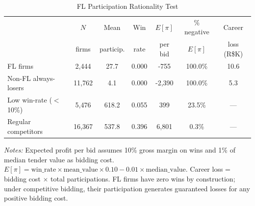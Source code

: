 \begin{table}[htbp]
\centering
\caption{FL Participation Rationality Test}
\label{tab:rationality}
\begin{threeparttable}
\small
\begin{tabular}{lcccccc}
\toprule
 & $N$ & Mean & Win & $E[\pi]$ & $\%$ negative & Career \\
 & firms & particip. & rate & per bid & $E[\pi]$ & loss (R\$K) \\
\midrule
FL firms & 2,444 & 27.7 & 0.000 & -755 & 100.0\% & 10.6 \\
Non-FL always-losers & 11,762 & 4.1 & 0.000 & -2,390 & 100.0\% & 5.3 \\
Low win-rate ($<$10\%) & 5,476 & 618.2 & 0.055 & 399 & 23.5\% & --- \\
Regular competitors & 16,367 & 537.8 & 0.396 & 6,801 & 0.3\% & --- \\
\bottomrule
\end{tabular}
\begin{tablenotes}
\small
\item \textit{Notes:} Expected profit per bid assumes 10\% gross margin on wins
and 1\% of median tender value as bidding cost.
$E[\pi] = \text{win\_rate} \times \text{mean\_value} \times 0.10 - 0.01 \times \text{median\_value}$.
Career loss = bidding cost $\times$ total participations.
FL firms have zero wins by construction; under competitive bidding,
their participation generates guaranteed losses for any positive bidding cost.
\end{tablenotes}
\end{threeparttable}
\end{table}
